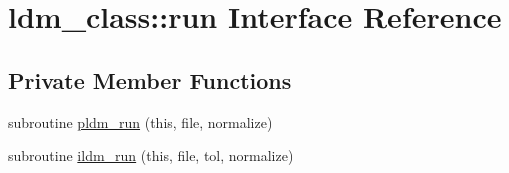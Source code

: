 \hypertarget{interfaceldm__class_1_1run}{\section{ldm\+\_\+class\+:\+:run Interface Reference}
\label{interfaceldm__class_1_1run}
}
\subsection*{Private Member Functions}
\begin{DoxyCompactItemize}
\item 
subroutine \hyperlink{interfaceldm__class_1_1run_ae56975ac32cfc8cb65104fed9f067cb3}{pldm\+\_\+run} (this, file, normalize)
\item 
subroutine \hyperlink{interfaceldm__class_1_1run_ae5381bcebc1707502872861734ffda4d}{ildm\+\_\+run} (this, file, tol, normalize)
\end{DoxyCompactItemize}


